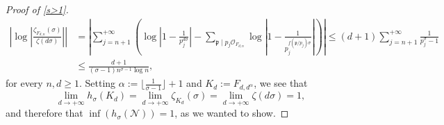 \documentclass[10pt,a4paper]{amsart}
\theoremstyle{plain}
\theoremstyle{definition}
\theoremstyle{remark}
\begin{document}
\begin{proof}[Proof of \cref{s>1}]
\[\begin{aligned}
                \left\lvert \log\left\lvert \frac{\zeta_{F_{d,n}}(\sigma)}{\zeta(d \sigma)}\right\rvert \right\rvert &= \left\lvert \sum_{j=n+1}^{+\infty} \left( \log\left\lvert 1 - \frac{1}{p_j^{d \sigma}} \right\rvert - \sum_{\mathfrak{p} \mid p_j \mathcal{O}_{F_{d,n}}} \log\left\lvert 1 - \frac{1}{p_j^{f(\mathfrak{p}/p_j) \sigma}} \right\rvert \right) \right\rvert \leq (d+1) \sum_{j=n+1}^{+\infty} \frac{1}{p_j^\sigma - 1} \\
                &\leq \frac{d+1}{(\sigma - 1) n^{\sigma - 1} \log n },
            \end{aligned}
        \]
        for every $n, d \geq 1$. Setting $\alpha := \lfloor \frac{1}{\sigma-1} \rfloor + 1$ and $K_d := F_{d,d^\alpha}$, we see that
        \[
            \lim_{d \to +\infty} h_\sigma(K_d) = \lim_{d \to +\infty} \zeta_{K_d}(\sigma) = \lim_{d \to +\infty} \zeta(d \sigma) = 1,
        \]
        and therefore that $\inf(h_\sigma(\mathcal{N})) = 1$, as we wanted to show.


\end{proof}
\end{document}
